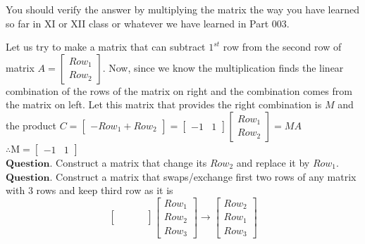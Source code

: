 \documentclass{article}
\begin{document}
You should verify the answer by multiplying the matrix the way you have learned so far in XI or XII class or whatever we have learned in Part 003.

Let us try to make a matrix that can subtract $1^{st}$ row from the second row of matrix \begin{math}A = \begin{bmatrix}
        Row_1 \\
        Row_2
    \end{bmatrix}\end{math}. Now, since we know the multiplication finds the linear combination of the rows of the matrix on right and the combination comes from the matrix on left. Let this matrix that provides the right combination is $M$ and the product \begin{math}C =  \begin{bmatrix} -Row_1 + Row_2 \end{bmatrix}
                                      = \begin{bmatrix}-1 & 1\end{bmatrix} \begin{bmatrix} Row_1 \\ Row_2 \end{bmatrix} = MA\end{math}\\
                                       
\begin{math}
\therefore \text{M} =    \begin{bmatrix}
                            -1 & 1
                        \end{bmatrix}
\end{math} \\

$\boldsymbol{Question}$. Construct a matrix that change its $Row_2$ and replace it by $Row_1$.\\

$\boldsymbol{Question}$. Construct a matrix that swaps/exchange first two rows of any matrix with 3 rows and keep third row as it is
\[
    \begin{bmatrix}
        & & & \\
        & & & \\
        & & & 
    \end{bmatrix} \begin{bmatrix}
                        Row_1\\
                        Row_2\\
                        Row_3
                  \end{bmatrix} \longrightarrow \begin{bmatrix}
                        Row_2\\
                        Row_1\\
                        Row_3
                                                \end{bmatrix}
\]
                                       
\end{document}
